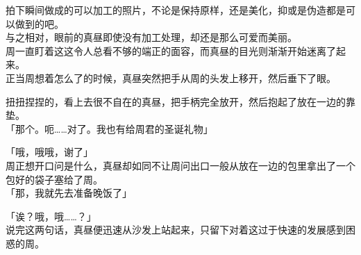 拍下瞬间做成的可以加工的照片，不论是保持原样，还是美化，抑或是伪造都是可以做到的吧。\\

与之相对，眼前的真昼即使没有加工处理，却还是那么可爱而美丽。\\

周一直盯着这这令人总看不够的端正的面容，而真昼的目光则渐渐开始迷离了起来。\\

正当周想着怎么了的时候，真昼突然把手从周的头发上移开，然后垂下了眼。

扭扭捏捏的，看上去很不自在的真昼，把手柄完全放开，然后抱起了放在一边的靠垫。\\

「那个。呃……对了。我也有给周君的圣诞礼物」

「哦，哦哦，谢了」\\

周正想开口问是什么，真昼却如同不让周问出口一般从放在一边的包里拿出了一个包好的袋子塞给了周。\\

「那，我就先去准备晚饭了」

「诶？哦，哦……？」\\

说完这两句话，真昼便迅速从沙发上站起来，只留下对着这过于快速的发展感到困惑的周。
